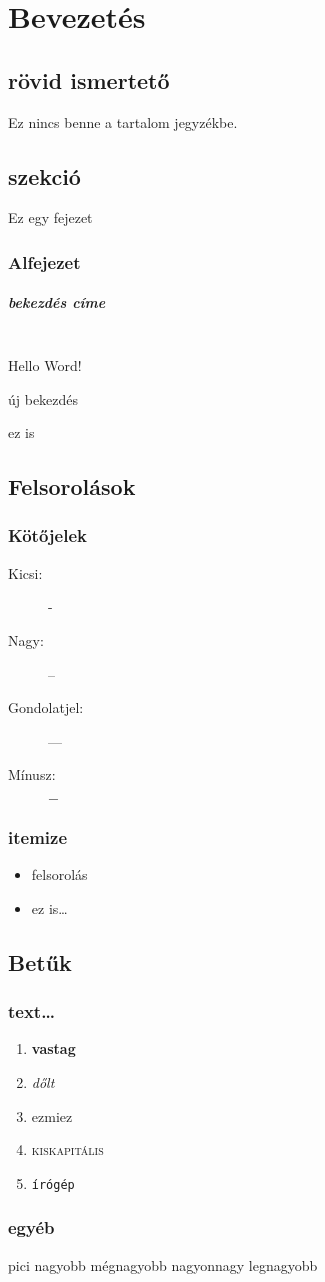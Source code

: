 \chapter{Bevezetés}
		\section*{rövid ismertető}
			Ez nincs benne a tartalom jegyzékbe.
		\section{szekció}
			Ez egy fejezet
			\subsection{Alfejezet}
				\paragraph{bekezdés címe}\mbox{} \\ %
				Hello Word!
				
				\noindent %
				új bekezdés
				
				ez is %
		\newpage		
		\section{Felsorolások}
			\subsection{Kötőjelek}
				\begin{description}
					\item[Kicsi:] -
					\item[Nagy:] --
					\item[Gondolatjel:] ---
					\item[Mínusz:] $-$
				\end{description}
			\subsection{itemize}
				\begin{itemize}
					\item felsorolás
					\item ez is\dots
				\end{itemize}
		\section{Betűk}
			\subsection{text\dots}
				\begin{enumerate}
					\item \textbf{vastag}
					\item \textit{dőlt}
					\item \textsf{ezmiez}
					\item \textsc{kiskapitális}
					\item \texttt{írógép}
				\end{enumerate}
			\subsection{egyéb}
			{\tiny pici}
			{\large nagyobb}
			{\Large mégnagyobb}
			{\huge nagyonnagy}
			{\Huge legnagyobb}